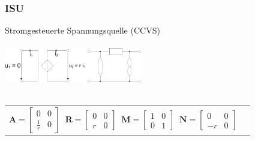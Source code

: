 \documentclass[a4paper,twocolumn,10pt]{article}
\begin{document}
\subsubsection*{ISU}
Stromgesteuerte Spannungsquelle (CCVS)\\\\
\includegraphics[width=0.45\textwidth]{Grafiken/OP_ISU}\\\\
\begin{tabular}{ll}
$\textbf{A}=\begin{bmatrix}0 & 0\\ \frac{1}{r} & 0\end{bmatrix}\;\;\textbf{R}=\begin{bmatrix}0 & 0\\ r & 0\end{bmatrix}\;\;\textbf{M}=\begin{bmatrix}1 & 0\\ 0 & 1\end{bmatrix}\;\;\textbf{N}=\begin{bmatrix}0 & 0\\ -r & 0\end{bmatrix}$
\end{tabular}
\end{document}
